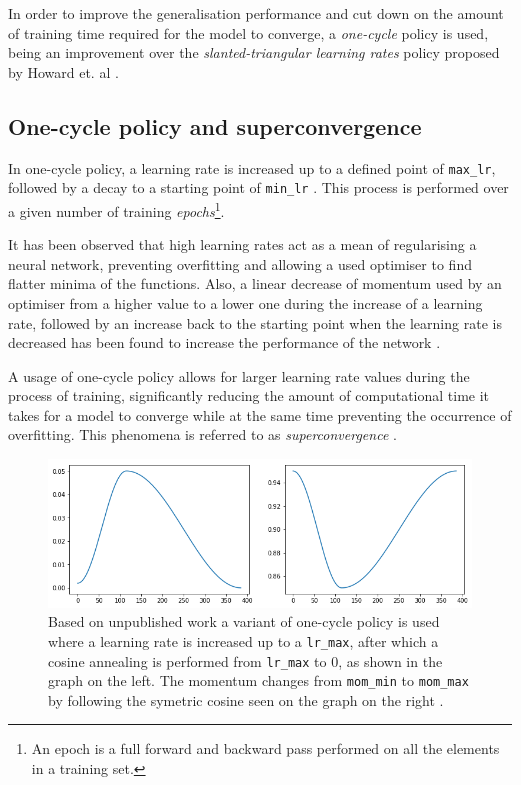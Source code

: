 In order to improve the generalisation performance and cut down on the amount of training time required for the model to converge, a \emph{one-cycle} policy is used, being an improvement over the \emph{slanted-triangular learning rates} policy proposed by Howard et. al \cite{ulmfit}.

\subsection{One-cycle policy and superconvergence}

In one-cycle policy, a learning rate is increased up to a defined point of \lstinline{max_lr}, followed by a decay to a starting point of \lstinline{min_lr} \cite{gugger:1cycle}. This process is performed over a given number of training \emph{epochs}\footnote{An epoch is a full forward and backward pass performed on all the elements in a training set.}.

It has been observed that high learning rates act as a mean of regularising a neural network, preventing overfitting and allowing a used optimiser to find flatter minima of the functions. Also, a linear decrease of momentum used by an optimiser from a higher value to a lower one during the increase of a learning rate, followed by an increase back to the starting point when the learning rate is decreased has been found to increase the performance of the network \cite{gugger:1cycle}. 

A usage of one-cycle policy allows for larger learning rate values during the process of training, significantly reducing the amount of computational time it takes for a model to converge while at the same time preventing the occurrence of overfitting. This phenomena is referred to as \emph{superconvergence} \cite{smith:cyclical}.

\begin{figure}[]
\centering
\includegraphics[scale=0.5]{figures/1cycle_new.png}
\caption{Based on unpublished work a variant of one-cycle policy is used where a learning rate is increased up to a \lstinline{lr_max}, after which a cosine annealing is performed from \lstinline{lr_max} to 0, as shown in the graph on the left. The momentum changes from \lstinline{mom_min} to \lstinline{mom_max} by following the symetric cosine seen on the graph on the right \cite{fastai:docs}.} 
\label{1cycle:chart}
\end{figure}

